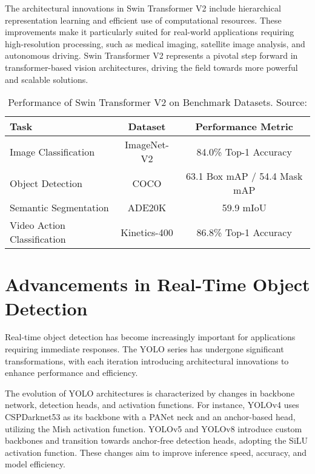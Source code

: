 \documentclass[3p,times]{elsarticle}
\begin{document}
The architectural innovations in Swin Transformer V2 include hierarchical representation learning and efficient use of computational resources. These improvements make it particularly suited for real-world applications requiring high-resolution processing, such as medical imaging, satellite image analysis, and autonomous driving. Swin Transformer V2 represents a pivotal step forward in transformer-based vision architectures, driving the field towards more powerful and scalable solutions.

\begin{table}[H]
\centering
\caption{Performance of Swin Transformer V2 on Benchmark Datasets. Source: \cite{liu2022swintransformerv2scaling}}
\label{tab:swin_transformer_v2_performance}
\begin{tabular}{|l|c|c|}
\hline
\textbf{Task} & \textbf{Dataset} & \textbf{Performance Metric} \\ \hline
Image Classification & ImageNet-V2 & 84.0\% Top-1 Accuracy \\ \hline
Object Detection & COCO & 63.1 Box mAP / 54.4 Mask mAP \\ \hline
Semantic Segmentation & ADE20K & 59.9 mIoU \\ \hline
Video Action Classification & Kinetics-400 & 86.8\% Top-1 Accuracy \\ \hline
\end{tabular}
\end{table}


\section{Advancements in Real-Time Object Detection} \label{advancements}

Real-time object detection has become increasingly important for applications requiring immediate responses. The YOLO series has undergone significant transformations, with each iteration introducing architectural innovations to enhance performance and efficiency.

The evolution of YOLO architectures is characterized by changes in backbone network, detection heads, and activation functions. For instance, YOLOv4 uses CSPDarknet53 as its backbone with a PANet neck and an anchor-based head, utilizing the Mish activation function. YOLOv5 and YOLOv8 introduce custom backbones and transition towards anchor-free detection heads, adopting the SiLU activation function. These changes aim to improve inference speed, accuracy, and model efficiency.
\end{document}
